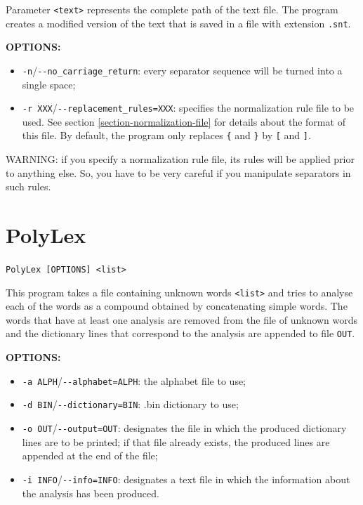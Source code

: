 \bigskip
\noindent {}Parameter \verb+<text>+ 
represents the complete path of the text file. The program
creates a modified version of the text that is saved in a file with extension
\verb+.snt+.

\bigskip
\noindent \textbf{OPTIONS:}
\begin{itemize}
  \item \verb+-n+/\verb+--no_carriage_return+: every separator sequence will be turned into a single space;
  
  \item \verb+-r XXX+/\verb+--replacement_rules=XXX+: specifies the
  normalization rule file to be used. See section \ref{section-normalization-file} 
  for details about the format of
  this file. By default, the program only replaces \verb+{+ and \verb+}+ by
  \verb+[+ and \verb+]+.
\end{itemize}

\bigskip
\noindent WARNING: if you specify a normalization rule file, its rules will be
applied prior to anything else. So, you have to be very careful if you
manipulate separators in such rules.






\section{PolyLex}
\verb+PolyLex [OPTIONS] <list>+


\bigskip
\noindent This program takes a file containing unknown words \verb+<list>+ and
tries to analyse each of the words as a compound obtained by concatenating simple words. The words
that have at least one analysis are removed from the file of unknown words and
the dictionary lines that correspond to the analysis are appended to file
\verb+OUT+. 

\bigskip
\noindent \textbf{OPTIONS:}
\begin{itemize}
  \item \verb+-a ALPH+/\verb+--alphabet=ALPH+: the alphabet file to use;

  \item \verb+-d BIN+/\verb+--dictionary=BIN+: .bin dictionary to use;

  \item \verb+-o OUT+/\verb+--output=OUT+: designates the file in which the 
  produced dictionary lines are to be printed; if that file already exists, 
  the produced lines are appended at the end of the file;

  \item \verb+-i INFO+/\verb+--info=INFO+: designates a text file in which 
  the information about the analysis has been produced.
\end{itemize}

